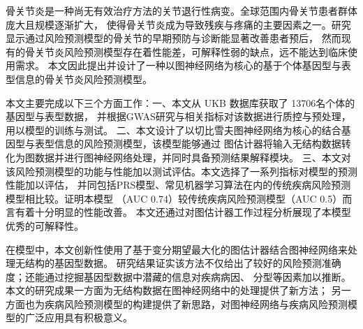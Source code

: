 
\clearpage
\titlespacing{\chapter}{0pt}{0mm}{5mm}



骨关节炎是一种尚无有效治疗方法的关节退行性病变。全球范围内骨关节患者群体庞大且规模逐渐扩大，
使得骨关节炎成为导致残疾与疼痛的主要因素之一。研究显示通过风险预测模型的骨关节的早期预防与诊断能显著改善患者预后，
然而现有的骨关节炎风险预测模型存在着性能差，可解释性弱的缺点，远不能达到临床使用需求。
本文因此提出并设计了一种以图神经网络为核心的基于个体基因型与表型信息的骨关节炎风险预测模型。

本文主要完成以下三个方面工作：一、本文从 UKB 数据库获取了 13706名个体的基因型与表型数据，
并根据GWAS研究与相关指标对该数据进行质控与预处理，用以模型的训练与测试。
二、本文设计了以切比雪夫图神经网络为核心的结合基因型与表型信息的风险预测模型，该模型能够通过
图估计器将输入无结构数据转化为图数据并进行图神经网络处理，并同时具备预测结果解释模块。
三、本文对该风险预测模型的功能与性能加以测试评估。本文选择了一系列指标对模型的预测性能加以评估，
并同包括PRS模型、常见机器学习算法在内的传统疾病风险预测模型相比较。证明本模型
（AUC 0.74）较传统疾病风险预测模型（AUC 0.5）而言有着十分明显的性能改善。
本文还通过对图估计器工作过程分析展现了本模型优秀的可解释性。

在模型中，本文创新性使用了基于变分期望最大化的图估计器结合图神经网络来处理无结构的基因型数据。
研究结果证实该方法不仅给出了较好的风险预测准确度；还能通过挖掘基因型数据中潜藏的信息对疾病病因、
分型等因素加以推断。本文的研究成果一方面为无结构数据在图神经网络中的处理提供了新方法；
另一方面也为疾病风险预测模型的构建提供了新思路，对图神经网络与疾病风险预测模型的广泛应用具有积极意义。



\vspace{\baselineskip}



\clearpage
{}

